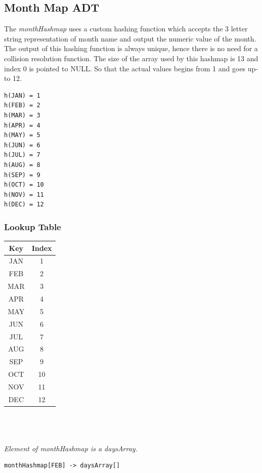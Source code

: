 \documentclass[12pt]{article}
\begin{document}
\subsection{Month Map ADT}
The {\em monthHashmap} uses a custom hashing function which accepts the 3 letter string representation of month name and output the numeric value of the month. The output of this hashing function is always unique, hence there is no need for a collision resolution function. The size of the array used by this hashmap is 13 and index 0 is pointed to NULL. So that the actual values begins from 1 and goes up-to 12.
\begin{lstlisting}
h(JAN) = 1
h(FEB) = 2
h(MAR) = 3
h(APR) = 4
h(MAY) = 5
h(JUN) = 6
h(JUL) = 7
h(AUG) = 8
h(SEP) = 9
h(OCT) = 10
h(NOV) = 11
h(DEC) = 12
\end{lstlisting}
\subsubsection{Lookup Table}
\begin{tabular}{| c | c |}
	\hline
	Key & Index \\
	\hline
	JAN & 1 \\
	\hline
	FEB & 2 \\
	\hline
	MAR & 3 \\
	\hline
	APR & 4 \\
	\hline
	MAY & 5 \\
	\hline
	JUN & 6 \\
	\hline
	JUL & 7 \\
	\hline
	AUG & 8 \\
	\hline
	SEP & 9 \\
	\hline
	OCT & 10 \\
	\hline
	NOV & 11 \\
	\hline
	DEC & 12 \\
	\hline
\end{tabular}
\\ \\ \\
{\em Element of monthHashmap is a daysArray.}
\begin{lstlisting}
monthHashmap[FEB] -> daysArray[]
\end{lstlisting}
\end{document}
